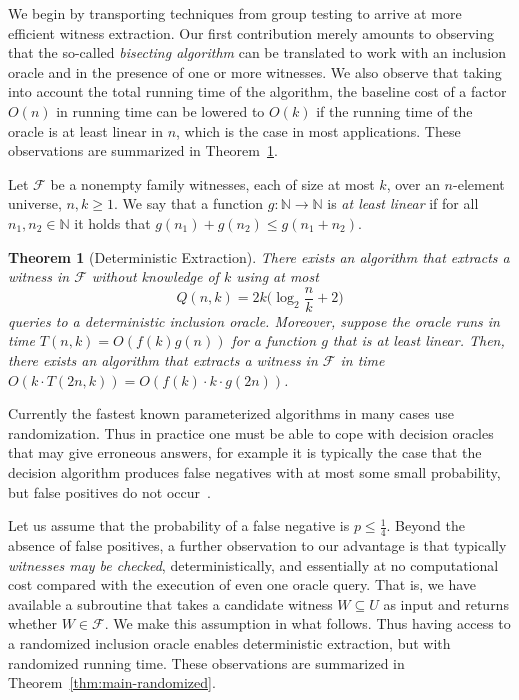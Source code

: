 \documentclass[11pt]{article}
\newtheorem{theorem}{Theorem}[]
\begin{document}
We begin by transporting techniques from group testing \cite{DuHwang2000} to arrive at more efficient witness extraction. Our first contribution merely amounts to observing that the so-called {\em bisecting algorithm} \cite{DuHwang1993} can be translated to work with an inclusion oracle and in the presence of one or more witnesses. We also observe that taking into account the total running time of the algorithm, the baseline cost of a factor $O(n)$ in running time can be lowered to $O(k)$ if the running time of the oracle is at least linear in $n$, which is the case in most applications. These observations are summarized in Theorem~\ref{thm:main-deterministic}.

Let $\mathcal{F}$ be a nonempty family witnesses, each of size at most $k$, 
over an $n$-element universe, $n,k\geq 1$.
We say that a function $g:\mathbb{N}\rightarrow\mathbb{N}$ is 
{\em at least linear} if for all $n_1,n_2\in\mathbb{N}$ it holds
that $g(n_1)+g(n_2)\leq g(n_1+n_2)$.

\begin{theorem}[Deterministic Extraction]
\label{thm:main-deterministic}
There exists an algorithm that extracts a witness in $\mathcal{F}$ 
without knowledge of $k$ using at most 
\[
Q(n,k)=2k\biggl(\log_2\frac{n}{k}+2\biggr)
\]
queries to a deterministic inclusion oracle. Moreover, suppose the
oracle runs in time $T(n,k)=O(f(k)g(n))$ for a function $g$ that 
is at least linear. Then, there exists an algorithm that 
extracts a witness in $\mathcal{F}$ in time $O(k\cdot T(2n,k))=O(f(k)\cdot k\cdot g(2n))$. 
\end{theorem}

Currently the fastest known parameterized algorithms 
in many cases use randomization. Thus in practice one must be able to 
cope with decision oracles that may give erroneous answers, for example 
it is typically the case that the decision algorithm produces false 
negatives with at most some small probability, but false positives do 
not occur~\cite{BjorklundHusfeldtKaskiKoivisto2010,BjorklundKaskiKowalik2013,Williams2009,Koutis2012}. 

Let us assume that the probability of a false negative is $p\leq \frac{1}4$. 
Beyond the absence of false positives, a further observation to our 
advantage is that typically {\em witnesses may be checked}, deterministically, 
and essentially at no computational cost compared with the
execution of even one oracle query. That is, we have available a subroutine
that takes a candidate witness $W\subseteq U$ as input and returns 
whether $W\in\mathcal{F}$. We make this assumption in what follows.
Thus having access to a randomized inclusion oracle enables deterministic
extraction, but with randomized running time. These observations are 
summarized in Theorem~\ref{thm:main-randomized}.
\end{document}

